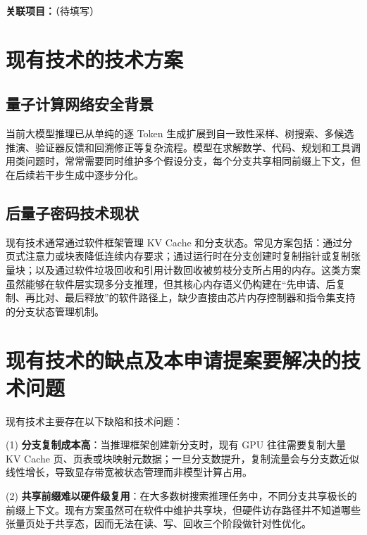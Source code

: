 \documentclass[12pt,a4paper]{article}
\begin{document}
\textbf{关联项目：}\underline{\hspace{8cm}}（待填写）

\section{现有技术的技术方案}

\subsection{量子计算网络安全背景}

当前大模型推理已从单纯的逐 Token 生成扩展到自一致性采样、树搜索、多候选推演、验证器反馈和回溯修正等复杂流程。模型在求解数学、代码、规划和工具调用类问题时，常常需要同时维护多个假设分支，每个分支共享相同前缀上下文，但在后续若干步生成中逐步分化。

\subsection{后量子密码技术现状}

现有技术通常通过软件框架管理 KV Cache 和分支状态。常见方案包括：通过分页式注意力或块表降低连续内存要求；通过运行时在分支创建时复制指针或复制张量块；以及通过软件垃圾回收和引用计数回收被剪枝分支所占用的内存。这类方案虽然能够在软件层实现多分支推理，但其核心内存语义仍构建在“先申请、后复制、再比对、最后释放”的软件路径上，缺少直接由芯片内存控制器和指令集支持的分支状态管理机制。

\section{现有技术的缺点及本申请提案要解决的技术问题}

现有技术主要存在以下缺陷和技术问题：

(1) \textbf{分支复制成本高}：当推理框架创建新分支时，现有 GPU 往往需要复制大量 KV Cache 页、页表或块映射元数据；一旦分支数提升，复制流量会与分支数近似线性增长，导致显存带宽被状态管理而非模型计算占用。

(2) \textbf{共享前缀难以硬件级复用}：在大多数树搜索推理任务中，不同分支共享极长的前缀上下文。现有方案虽然可在软件中维护共享块，但硬件访存路径并不知道哪些张量页处于共享态，因而无法在读、写、回收三个阶段做针对性优化。
\end{document}
